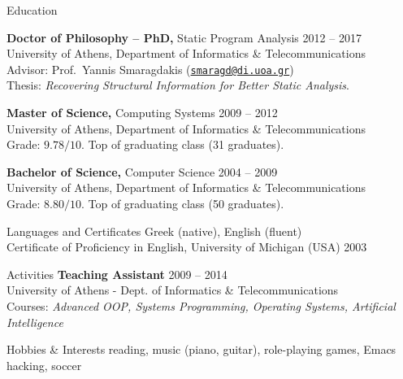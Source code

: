 \documentclass{resume}
\begin{document}

\begin{rSection}{Education}

{\bf Doctor of Philosophy -- PhD,} Static Program Analysis \hfill {2012 -- 2017} \\
University of Athens, Department of Informatics \& Telecommunications \\
Advisor: Prof.~Yannis Smaragdakis
(\href{smaragd@di.uoa.gr}{\nolinkurl{smaragd@di.uoa.gr}}) \\
Thesis: \emph{Recovering Structural Information for Better Static Analysis}.

{\bf Master of Science,} Computing Systems \hfill {2009 -- 2012} \\
University of Athens, Department of Informatics \& Telecommunications \\
Grade: $9.78 / 10$. Top of graduating class (31 graduates).

{\bf Bachelor of Science,} Computer Science \hfill {2004 -- 2009}  \\
University of Athens, Department of Informatics \& Telecommunications \\
Grade: $8.80 / 10$. Top of graduating class (\mytilde{}50 graduates).

\end{rSection}


\begin{rSection}{Languages and Certificates}
  Greek (native), English (fluent) \\
  Certificate of Proficiency in English, University of Michigan (USA)
  \hfill 2003
\end{rSection}


\begin{rSection}{Activities}
  {\bf Teaching Assistant} \hfill {2009 -- 2014} \\
  University of Athens - Dept. of Informatics \& Telecommunications \\
  Courses: \emph{Advanced OOP, Systems Programming, Operating Systems,
    Artificial Intelligence}
\end{rSection}

\begin{rSection}{Hobbies \& Interests}
  reading, music (piano, guitar), role-playing games, Emacs hacking, soccer
\end{rSection}
\end{document}
